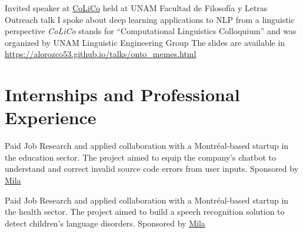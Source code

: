 \documentclass[8pt,a4paper,sans]{moderncv} %
\begin{document}
        {Invited speaker at \href{http://www.corpus.unam.mx/colico/VIIICoLiCo.html}{CoLiCo} held at UNAM Facultad de Filosofía y Letras}
        {Outreach talk}
        {I spoke about deep learning applications to NLP from a linguistic perspective}
        {\emph{CoLiCo} stands for ``Computational Linguistics Colloquium'' and was organized by UNAM Linguistic Engineering Group}
        {The slides are available in \url{https://alorozco53.github.io/talks/onto_memes.html}}






\section{Internships and Professional Experience}

        {Paid Job}
        {Research and applied collaboration with a Montréal-based startup in the education sector. 
        The project aimed to equip the company’s chatbot to understand and correct invalid
        source code errors from user inputs.}
        {Sponsored by \href{https://mila.quebec/en}{Mila}}
        {}

        {Paid Job}
        {Research and applied collaboration with a Montréal-based startup in the health sector.
         The project aimed to build a speech recognition solution to detect children's language disorders.}
        {Sponsored by \href{https://mila.quebec/en}{Mila}}
        {}
\end{document}
